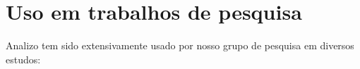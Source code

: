 \begin{itemize}

\end{itemize}

\section{Uso em trabalhos de pesquisa}
\label{trabalhos-analizo}

Analizo tem sido extensivamente usado por nosso grupo de pesquisa em diversos
estudos:

